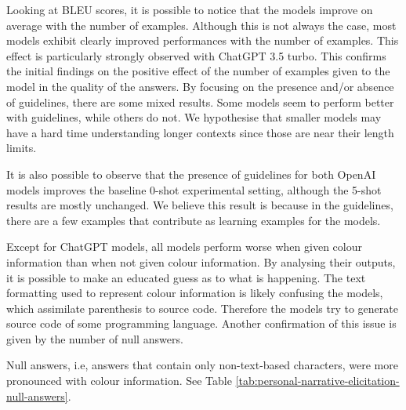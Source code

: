 
% 
% 

Looking at BLEU scores, it is possible to notice that the models improve on average with the number of examples. Although this is not always the case, most models exhibit clearly improved performances with the number of examples. This effect is particularly strongly observed with ChatGPT 3.5 turbo. This confirms the initial findings on the positive effect of the number of examples given to the model in the quality of the answers.
By focusing on the presence and/or absence of guidelines, there are some mixed results. Some models seem to perform better with guidelines, while others do not. We hypothesise that smaller models may have a hard time understanding longer contexts since those are near their length limits. 

It is also possible to observe that the presence of guidelines for both OpenAI models improves the baseline 0-shot experimental setting, although the 5-shot results are mostly unchanged. We believe this result is because in the guidelines, there are a few examples that contribute as learning examples for the models.  

Except for ChatGPT models, all models perform worse when given colour information than when not given colour information. By analysing their outputs, it is possible to make an educated guess as to what is happening. The text formatting used to represent colour information is likely confusing the models, which assimilate parenthesis to source code. Therefore the models try to generate source code of some programming language. Another confirmation of this issue is given by the number of null answers. 

Null answers, i.e, answers that contain only non-text-based characters, were more pronounced with colour information. See Table \ref{tab:personal-narrative-elicitation-null-answers}.

